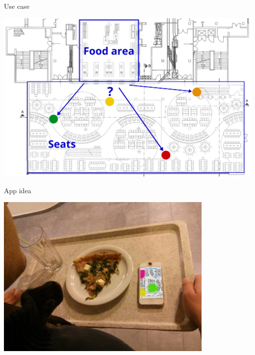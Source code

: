 \documentclass[11pt]{beamer}
\begin{document}
\begin{frame}{Use case}

	\begin{center}

        \includegraphics[width=\textwidth]{mensa-floor-plan-people-moving}
    
    \end{center}

\end{frame}

\begin{frame}{App idea}

    \begin{center}

        \vspace*{-14pt}\includegraphics[width=0.8\textwidth]{navitablet}
    
    \end{center}
    
\end{frame}
\end{document}
